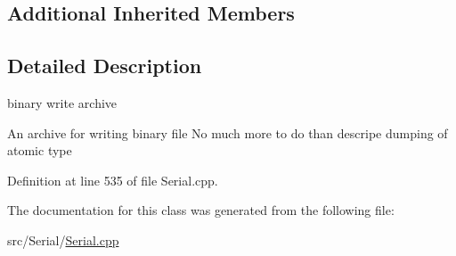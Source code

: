 \subsection*{Additional Inherited Members}


\subsection{Detailed Description}
binary write archive 

An archive for writing binary file No much more to do than descripe dumping of atomic type 

Definition at line 535 of file Serial.\+cpp.



The documentation for this class was generated from the following file\+:\begin{DoxyCompactItemize}
\item 
src/\+Serial/\hyperlink{Serial_8cpp}{Serial.\+cpp}\end{DoxyCompactItemize}
